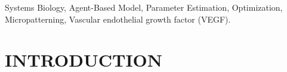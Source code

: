\documentclass[conference]{IEEEtran}
\begin{document}







\maketitle

\begin{abstract}

\end{abstract}



\renewcommand\IEEEkeywordsname{Key Words}
\begin{IEEEkeywords}
Systems Biology, Agent-Based Model, Parameter Estimation, Optimization, Micropatterning, Vascular endothelial growth factor (VEGF).
\end{IEEEkeywords}








%



\section{INTRODUCTION}
\IEEEPARstart

%
%
%
%
\end{document}
